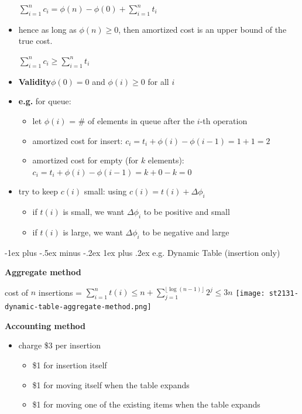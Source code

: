 \documentclass[10pt, landscape]{article}
\makeatletter
\renewcommand{\subsubsection}{\@startsection{subsubsection}{3}{0mm}%
  {-1ex plus -.5ex minus -.2ex}%
  {1ex plus .2ex}%
{\normalfont\small\bfseries}}%
\makeatother
\begin{document}
\begin{multicols*}{4}
\begin{itemize}
\begin{tightcenter}
        $\sum^n_{i=1} c_i = \phi(n) - \phi(0) + \sum^n_{i=1} t_i$
      \end{tightcenter}
    \item hence as long as $\phi(n) \geq 0$, then amortized cost is an upper bound of the true cost. 
      \begin{tightcenter}
        $\sum^n_{i=1} c_i \geq \sum^n_{i=1} t_i$
      \end{tightcenter}
    \item \textbf{Validity}$\phi(0) = 0$ and $\phi(i) \geq 0$ for all $i$
    \item \textbf{e.g.} for queue:
      \begin{itemize}
        \item let $\phi(i)$ = \# of elements in queue after the $i$-th operation
        \item amortized cost for insert: $c_i = t_i + \phi(i) - \phi(i-1) = 1 + 1 = 2$
        \item amortized cost for empty (for $k$ elements): $c_i = t_i + \phi(i) - \phi(i-1) = k + 0 - k = 0 $
      \end{itemize}
    \item try to keep $c(i)$ small: using $c(i) = t(i) + \Delta \phi_i$
      \begin{itemize}
        \item if $t(i)$ is small, we want $\Delta \phi_i$ to be positive and small
        \item if $t(i)$ is large, we want $\Delta \phi_i$ to be negative and large 
      \end{itemize}
  \end{itemize}

  \subsubsection{e.g. Dynamic Table (insertion only)}

  \textbf{Aggregate method}

  \begin{tightcenter}
    cost of $n$ insertions = $\sum^n_{i=1} t(i) \leq n + \sum^{ \lfloor \log(n-1) \rfloor  }_{j=1} 2^j \leq 3n$
    \texttt{[image: st2131-dynamic-table-aggregate-method.png]} 
  \end{tightcenter}


  \textbf{Accounting method}

  \begin{itemize}
    \item charge \$3 per insertion
      \begin{itemize}
        \item \$1 for insertion itself
        \item \$1 for moving itself when the table expands
        \item \$1 for moving one of the existing items when the table expands
      \end{itemize}
  \end{itemize}


\end{multicols*}
\end{document}
